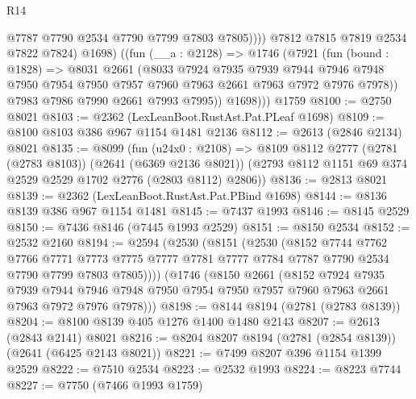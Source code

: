 \begin{lexlean}{R14}
\begin{coremodule}
                  @7787
                  @7790
                  @2534
                  @7790
                  @7799
                  @7803
                  @7805))))
          @7812
          @7815
          @7819
          @2534
          @7822
          @7824)
          @1698)
        ((fun (__a : @2128) =>
        @1746
          (@7921
            (fun (bound : @1828) =>
            @8031
              @2661
              (@8033
                @7924
                @7935
                @7939
                @7944
                @7946
                @7948
                @7950
                @7954
                @7950
                @7957
                @7960
                @7963
                @2661
                @7963
                @7972
                @7976
                @7978))
            @7983
            @7986
            @7990
            @2661
            @7993
            @7995))
          @1698)))
    @1759
@8100 := @2750 @8021
@8103 := @2362 (LexLeanBoot.RustAst.Pat.PLeaf @1698)
@8109 := @8100 @8103 @386 @967 @1154 @1481 @2136
@8112 := @2613 (@2846 @2134) @8021
@8135 := @8099
    (fun (u24x0 : @2108) =>
    @8109
      @8112
      @2777
      (@2781 (@2783 @8103))
      (@2641 (@6369 @2136 @8021))
      (@2793 @8112 @1151 @69 @374 @2529 @2529 @1702 @2776 (@2803 @8112) @2806))
@8136 := @2813 @8021
@8139 := @2362 (LexLeanBoot.RustAst.Pat.PBind @1698)
@8144 := @8136 @8139 @386 @967 @1154 @1481
@8145 := @7437 @1993
@8146 := @8145 @2529
@8150 := @7436 @8146 (@7445 @1993 @2529)
@8151 := @8150 @2534
@8152 := @2532 @2160
@8194 := @2594
    (@2530
      (@8151
        (@2530
          (@8152
            @7744
            @7762
            @7766
            @7771
            @7773
            @7775
            @7777
            @7781
            @7777
            @7784
            @7787
            @7790
            @2534
            @7790
            @7799
            @7803
            @7805))))
    (@1746
      (@8150
        @2661
        (@8152
          @7924
          @7935
          @7939
          @7944
          @7946
          @7948
          @7950
          @7954
          @7950
          @7957
          @7960
          @7963
          @2661
          @7963
          @7972
          @7976
          @7978)))
@8198 := @8144 @8194 (@2781 (@2783 @8139))
@8204 := @8100 @8139 @405 @1276 @1400 @1480 @2143
@8207 := @2613 (@2843 @2141) @8021
@8216 := @8204 @8207 @8194 (@2781 (@2854 @8139)) (@2641 (@6425 @2143 @8021))
@8221 := @7499 @8207 @396 @1154 @1399 @2529
@8222 := @7510 @2534
@8223 := @2532 @1993
@8224 := @8223 @7744
@8227 := @7750 (@7466 @1993 @1759)

\end{coremodule}
\end{lexlean}
